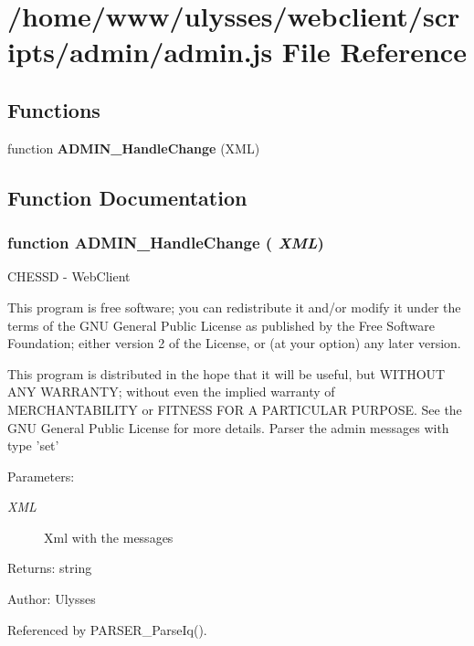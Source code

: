 \section{/home/www/ulysses/webclient/scripts/admin/admin.js File Reference}
\label{admin_8js}
\subsection*{Functions}
\begin{CompactItemize}
\item 
function {\bf ADMIN\_\-HandleChange} (XML)
\end{CompactItemize}


\subsection{Function Documentation}
\subsubsection{\setlength{\rightskip}{0pt plus 5cm}function ADMIN\_\-HandleChange ( {\em XML})}\label{admin_8js_b0616f0abf5fabebd60f4d6d3fb0ac04}


CHESSD - WebClient

This program is free software; you can redistribute it and/or modify it under the terms of the GNU General Public License as published by the Free Software Foundation; either version 2 of the License, or (at your option) any later version.

This program is distributed in the hope that it will be useful, but WITHOUT ANY WARRANTY; without even the implied warranty of MERCHANTABILITY or FITNESS FOR A PARTICULAR PURPOSE. See the GNU General Public License for more details. Parser the admin messages with type 'set'

\begin{Desc}
\item[Parameters:]
\begin{description}
\item[{\em XML}]Xml with the messages \end{description}
\end{Desc}
\begin{Desc}
\item[Returns:]string \end{Desc}
\begin{Desc}
\item[Author:]Ulysses \end{Desc}


Referenced by PARSER\_\-ParseIq().